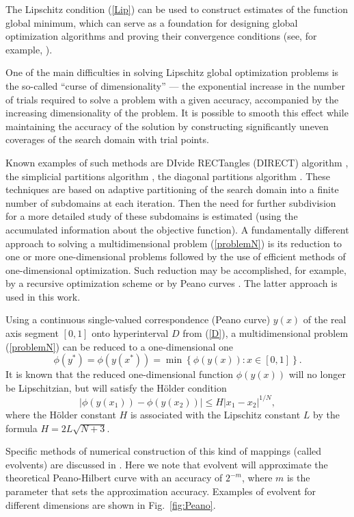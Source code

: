 \documentclass[mathematics,article,submit,pdftex,moreauthors]{Definitions/mdpi}
\begin{document}
The Lipschitz condition (\ref{Lip}) can be used to construct estimates of the function global minimum, which can serve as a foundation for designing global optimization algorithms and proving their convergence conditions (see, for example, \cite{Strongin2000}).

One of the main difficulties in solving Lipschitz global optimization problems is the so-called ``curse of dimensionality'' --- the exponential increase in the number of trials required to solve a problem with a given accuracy, accompanied by the increasing dimensionality of the problem. It is possible to smooth this effect while maintaining the accuracy of the solution by constructing significantly uneven coverages of the search domain with trial points.

Known examples of such methods are DIvide RECTangles (DIRECT) algorithm \cite{Jones1993}, the simplicial partitions algorithm \cite{PaulaviciusZilinskas2014}, the diagonal partitions algorithm \cite{Sergeyev2017}. These techniques are based on adaptive partitioning of the search domain into a finite number of subdomains at each iteration.
Then the need for further subdivision for a more detailed study of these subdomains is estimated (using the accumulated information about the objective function). 
A fundamentally different approach to solving a multidimensional problem (\ref{problemN}) is its reduction to one or more one-dimensional problems followed by the use of efficient methods of one-dimensional optimization. Such reduction may be accomplished, for example, by a recursive optimization scheme \cite{Grishagin2018} or by Peano curves \cite{Barkalov2018}. The latter approach is used in this work.

Using a continuous single-valued correspondence (Peano curve) $y(x)$ of the real axis segment $[0,1]$ onto hyperinterval $D$ from (\ref{D}), a multidimensional problem (\ref{problemN}) can be reduced to a one-dimensional one
\[
\phi(y^\ast)=\phi(y(x^\ast))=\min{\left\{\phi(y(x)): x\in[0,1]\right\}}.
\]
It is known \cite{Strongin2000, Sergeyev2013} that the reduced one-dimensional function $\phi(y(x))$ will no longer be Lipschitzian, but will satisfy the H{\"o}lder condition
\[
\left|\phi(y(x_1))-\phi(y(x_2))\right|\leq H\left|x_1-x_2\right|^{1/N},
\]
where the H{\"o}lder constant $H$ is associated with the Lipschitz constant $L$ by the formula $ H=2 L \sqrt{N+3}$.

Specific methods of numerical construction of this kind of mappings (called evolvents) are discussed in \cite{Strongin2000,Sergeyev2013}.
Here we note that evolvent will approximate the theoretical Peano-Hilbert curve with an accuracy of $2^{-m}$, where $m$ is the parameter that sets the approximation accuracy. Examples of evolvent for different dimensions are shown in Fig.~\ref{fig:Peano}.
\end{document}
